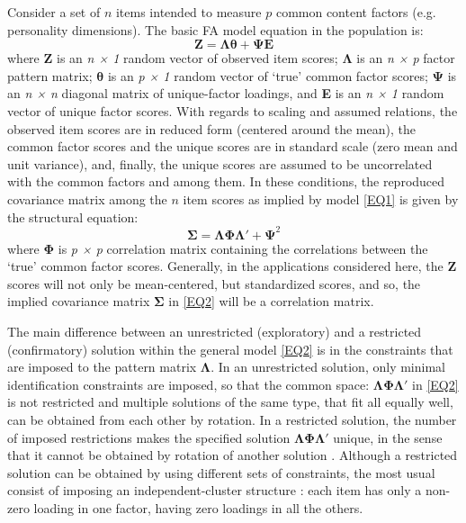 Consider a set of $n$ items intended to measure $p$ common content factors (e.g. personality dimensions). The basic FA model equation in the population is:
\begin{equation}
  \label{EQ1}
  \mathbf{Z} = \boldsymbol{\Lambda} \boldsymbol{\theta} + \boldsymbol{\Psi} \mathbf{E}
\end{equation}
where \textbf{Z} is an \textit{n × 1} random vector of observed item scores; $\boldsymbol{\Lambda}$ is an \textit{n × p} factor pattern matrix; $\boldsymbol{\theta}$ is an \textit{p × 1} random vector of ‘true’ common factor scores; $\boldsymbol{\Psi}$ is an \textit{n × n} diagonal matrix of unique-factor loadings, and \textbf{E} is an  \textit{n × 1} random vector of unique factor scores. With regards to scaling and assumed relations, the observed item scores are in reduced form (centered around the mean), the common factor scores and the unique scores are in standard scale (zero mean and unit variance), and, finally, the unique scores are assumed to be uncorrelated with the common factors and among them. In these conditions, the reproduced covariance matrix among the $n$ item scores as implied by model \eqref{EQ1} is given by the structural equation:
\begin{equation}
  \label{EQ2}
  \boldsymbol{\Sigma} = \boldsymbol{\Lambda} \boldsymbol{\Phi} \boldsymbol{\Lambda'}  + \boldsymbol{\Psi}^{2}
\end{equation}
where $\boldsymbol{\Phi}$ is \textit{p × p}  correlation matrix containing the correlations between the ‘true’ common factor scores. Generally, in the applications considered here, the \textbf{Z} scores will not only be mean-centered, but standardized scores, and so, the implied covariance matrix $\boldsymbol{\Sigma}$ in \eqref{EQ2} will be a correlation matrix.

The main difference between an unrestricted (exploratory) and a restricted (confirmatory) solution within the general model \eqref{EQ2} is in the constraints that are imposed to the pattern matrix $\boldsymbol{\Lambda}$. In an unrestricted solution, only minimal identification constraints are imposed, so that the common space: $\boldsymbol{\Lambda} \boldsymbol{\Phi} \boldsymbol{\Lambda'}$ in \eqref{EQ2} is not restricted and multiple solutions of the same type, that fit all equally well, can be obtained from each other by rotation. In a restricted solution, the number of imposed restrictions makes the specified solution $\boldsymbol{\Lambda} \boldsymbol{\Phi} \boldsymbol{\Lambda'}$ unique, in the sense that it cannot be obtained by rotation of another solution  \citep[see][]{Joreskog:1969}. Although a restricted solution can be obtained by using different sets of constraints, the most usual consist of imposing an independent-cluster structure \citep[e.g.][]{McDonald:2000}: each item has only a non-zero loading in one factor, having zero loadings in all the others.

